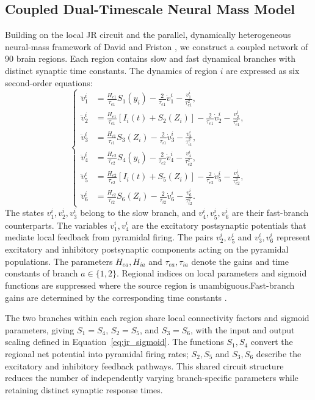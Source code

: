 \documentclass{article}
\begin{document}
\subsection{Coupled Dual-Timescale Neural Mass Model}
\label{sec:neurodyn-dual-kinetic}
Building on the local JR circuit \citep{jansen1995electroencephalogram} and the parallel, dynamically heterogeneous neural-mass framework of David and Friston \citep{david2003modeling}, we construct a coupled network of 90 brain regions. Each region contains slow and fast dynamical branches with distinct synaptic time constants. The dynamics of region $i$ are expressed as six second-order equations:
\begin{equation}
\left\{
\begin{aligned}
\ddot v_1^i &= \frac{H_{e1}}{\tau_{e1}}S_1(y_i)
-\frac{2}{\tau_{e1}}\dot v_1^i-\frac{v_1^i}{\tau_{e1}^{2}},\\
\ddot v_2^i &= \frac{H_{e1}}{\tau_{e1}}\left[I_i(t)+S_2(Z_i)\right]
-\frac{2}{\tau_{e1}}\dot v_2^i-\frac{v_2^i}{\tau_{e1}^{2}},\\
\ddot v_3^i &= \frac{H_{i1}}{\tau_{i1}}S_3(Z_i)
-\frac{2}{\tau_{i1}}\dot v_3^i-\frac{v_3^i}{\tau_{i1}^{2}},\\
\ddot v_4^i &= \frac{H_{e2}}{\tau_{e2}}S_4(y_i)
-\frac{2}{\tau_{e2}}\dot v_4^i-\frac{v_4^i}{\tau_{e2}^{2}},\\
\ddot v_5^i &= \frac{H_{e2}}{\tau_{e2}}\left[I_i(t)+S_5(Z_i)\right]
-\frac{2}{\tau_{e2}}\dot v_5^i-\frac{v_5^i}{\tau_{e2}^{2}},\\
\ddot v_6^i &= \frac{H_{i2}}{\tau_{i2}}S_6(Z_i)
-\frac{2}{\tau_{i2}}\dot v_6^i-\frac{v_6^i}{\tau_{i2}^{2}}.
\end{aligned}
\right.
\tag{2.1}\label{eq:neurodyn-dual-kinetic}
\end{equation}
The states $v_1^i,v_2^i,v_3^i$ belong to the slow branch, and $v_4^i,v_5^i,v_6^i$ are their fast-branch counterparts. The variables $v_1^i,v_4^i$ are the excitatory postsynaptic potentials that mediate local feedback from pyramidal firing. The pairs $v_2^i,v_5^i$ and $v_3^i,v_6^i$ represent excitatory and inhibitory postsynaptic components acting on the pyramidal populations. The parameters $H_{ea},H_{ia}$ and $\tau_{ea},\tau_{ia}$ denote the gains and time constants of branch $a\in\{1,2\}$. Regional indices on local parameters and sigmoid functions are suppressed where the source region is unambiguous.Fast-branch gains are determined by the corresponding time constants \citet{coroneloliveros2026multifrequency}. 


The two branches within each region share local connectivity factors and sigmoid parameters, giving $S_1=S_4$, $S_2=S_5$, and $S_3=S_6$, with the input and output scaling defined in Equation~\eqref{eq:jr_sigmoid}. The functions $S_1,S_4$ convert the regional net potential into pyramidal firing rates; $S_2,S_5$ and $S_3,S_6$ describe the excitatory and inhibitory feedback pathways. This shared circuit structure reduces the number of independently varying branch-specific parameters while retaining distinct synaptic response times.
\end{document}
